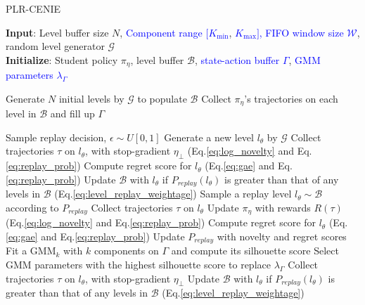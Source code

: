 \begin{algorithm}[t]
    \caption{PLR-CENIE}
    \label{alg:plr_cenie}
    \textbf{Input}: Level buffer size $N$, \textcolor{blue}{Component range $[K_{\text{min}}$}, \textcolor{blue}{$K_{\text{max}}]$, FIFO window size $\mathcal{W}$}, random level generator $\mathcal{G}$ \\
    \textbf{Initialize}: Student policy $\pi_\eta$, level buffer $\mathcal{B}$, \textcolor{blue}{state-action buffer $\Gamma$}, \textcolor{blue}{GMM parameters $\lambda_{\Gamma}$}
    
    \begin{algorithmic}[1]
    \STATE Generate $N$ initial levels by $\mathcal{G}$ to populate $\mathcal{B}$ 
    \STATE Collect $\pi_\eta$'s trajectories on each level in $\mathcal{B}$ and fill up $\Gamma$ 
    
    \STATE Sample replay decision, $\epsilon \sim U[0, 1]$
    \STATE Generate a new level $l_{\theta}$ by $\mathcal{G}$
    \STATE Collect trajectories $\tau$ on $l_{\theta}$, with stop-gradient $\eta_{\perp}$
    \begingroup
    \color{blue}
     (Eq.\ref{eq:log_novelty} and Eq.\ref{eq:replay_prob})
    \endgroup
    \STATE Compute regret score for $l_{\theta}$ (Eq.\ref{eq:gae} and Eq.\ref{eq:replay_prob})
    \STATE Update $\mathcal{B}$ with $l_{\theta}$ if $P_{replay}(l_{\theta})$ is greater than that of any levels in $\mathcal{B}$ (Eq.\ref{eq:level_replay_weightage})
    \ELSE
    \STATE Sample a replay level $l_{\theta} \sim \mathcal{B}$ according to $P_{replay}$
    \STATE Collect trajectories $\tau$ on $l_{\theta}$
    \STATE Update $\pi_\eta$ with rewards $R(\tau)$
    \begingroup
    \color{blue}
     (Eq.\ref{eq:log_novelty} and Eq.\ref{eq:replay_prob})
    \endgroup 
    \STATE Compute regret score for $l_{\theta}$ (Eq.\ref{eq:gae} and Eq.\ref{eq:replay_prob})
    \STATE Update $P_{replay}$ with novelty and regret scores
    \begingroup
    \color{blue}
    \STATE Fit a GMM$_k$ with $k$ components on $\Gamma$ and compute its silhouette score
    \ENDFOR
    \STATE Select GMM parameters with the highest silhouette score to replace $\lambda_{\Gamma}$
    \endgroup
    \STATE Collect trajectories $\tau$ on $l_{\theta}$, with stop-gradient $\eta_{\perp}$ 
    \STATE Update $\mathcal{B}$ with $l_{\theta}$ if $P_{replay}(l_{\theta})$ is greater than that of any levels in $\mathcal{B}$ (Eq.\ref{eq:level_replay_weightage})
    \ENDIF
    \ENDWHILE
    \end{algorithmic}
\end{algorithm}




